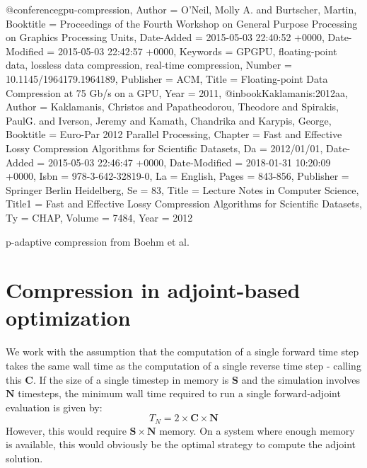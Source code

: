 \documentclass[conference]{IEEEtran}
\begin{document}
@conference{gpu-compression,
    Author = {O'Neil, Molly A. and Burtscher, Martin},
    Booktitle = {Proceedings of the Fourth Workshop on General Purpose Processing on Graphics Processing Units},
    Date-Added = {2015-05-03 22:40:52 +0000},
    Date-Modified = {2015-05-03 22:42:57 +0000},
    Keywords = {GPGPU, floating-point data, lossless data compression, real-time compression},
    Number = {10.1145/1964179.1964189},
    Publisher = {ACM},
    Title = {Floating-point Data Compression at 75 Gb/s on a {GPU}},
    Year = {2011},
}
@inbook{Kaklamanis:2012aa,
    Author = {Kaklamanis, Christos and Papatheodorou, Theodore and Spirakis, PaulG. and Iverson, Jeremy and Kamath, Chandrika and Karypis, George},
    Booktitle = {Euro-Par 2012 Parallel Processing},
    Chapter = {Fast and Effective Lossy Compression Algorithms for Scientific Datasets},
    Da = {2012/01/01},
    Date-Added = {2015-05-03 22:46:47 +0000},
    Date-Modified = {2018-01-31 10:20:09 +0000},
    Isbn = {978-3-642-32819-0},
    La = {English},
    Pages = {843-856},
    Publisher = {Springer Berlin Heidelberg},
    Se = {83},
    Title = {Lecture Notes in Computer Science},
    Title1 = {Fast and Effective Lossy Compression Algorithms for Scientific Datasets},
    Ty = {CHAP},
    Volume = {7484},
    Year = {2012}}

p-adaptive compression from Boehm et al. 

\section{Compression in adjoint-based optimization}
We work with the assumption that the computation of a single forward time step takes the same wall time
as the computation of a single reverse time step - calling this $\mathbf{C}$. If the size of a single 
timestep in memory is $\mathbf{S}$ and the simulation involves $\mathbf{N}$ timesteps, the minimum
wall time required to run a single forward-adjoint evaluation is given by:
\begin{equation}
T_N = 2 \times \mathbf{C} \times \mathbf{N}
\end{equation}
However, this would require $\mathbf{S} \times \mathbf{N}$ memory. On a system where enough memory
is available, this would obviously be the optimal strategy to compute the adjoint solution. 
\end{document}
